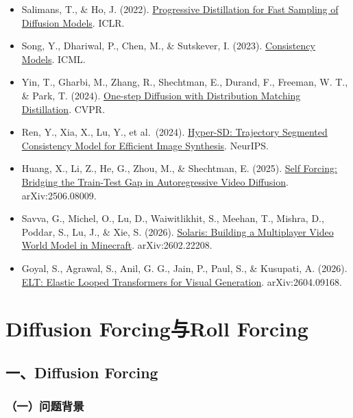 \vspace{0.25em}
\begin{itemize}
\tightlist
\item
  Salimans, T., \& Ho, J. (2022). \href{https://arxiv.org/abs/2202.00512}{Progressive Distillation for Fast Sampling of Diffusion Models}. ICLR.
\item
  Song, Y., Dhariwal, P., Chen, M., \& Sutskever, I. (2023). \href{https://arxiv.org/abs/2303.01469}{Consistency Models}. ICML.
\item
  Yin, T., Gharbi, M., Zhang, R., Shechtman, E., Durand, F., Freeman, W. T., \& Park, T. (2024). \href{https://arxiv.org/abs/2311.18828}{One-step Diffusion with Distribution Matching Distillation}. CVPR.
\item
  Ren, Y., Xia, X., Lu, Y., et al.~(2024). \href{https://arxiv.org/abs/2404.13686}{Hyper-SD: Trajectory Segmented Consistency Model for Efficient Image Synthesis}. NeurIPS.
\item
  Huang, X., Li, Z., He, G., Zhou, M., \& Shechtman, E. (2025). \href{https://arxiv.org/abs/2506.08009}{Self Forcing: Bridging the Train-Test Gap in Autoregressive Video Diffusion}. arXiv:2506.08009.
\item
  Savva, G., Michel, O., Lu, D., Waiwitlikhit, S., Meehan, T., Mishra, D., Poddar, S., Lu, J., \& Xie, S. (2026). \href{https://arxiv.org/abs/2602.22208}{Solaris: Building a Multiplayer Video World Model in Minecraft}. arXiv:2602.22208.
\item
  Goyal, S., Agrawal, S., Anil, G. G., Jain, P., Paul, S., \& Kusupati, A. (2026). \href{https://arxiv.org/abs/2604.09168}{ELT: Elastic Looped Transformers for Visual Generation}. arXiv:2604.09168.
\end{itemize}

\clearpage

\hypertarget{diffusion-forcingux4e0eroll-forcing}{%
\section{Diffusion Forcing与Roll Forcing}\label{diffusion-forcingux4e0eroll-forcing}}

\hypertarget{ux4e00diffusion-forcing}{%
\subsection{一、Diffusion Forcing}\label{ux4e00diffusion-forcing}}

\hypertarget{ux4e00ux95eeux9898ux80ccux666f-2}{%
\subsubsection{（一）问题背景}\label{ux4e00ux95eeux9898ux80ccux666f-2}}

